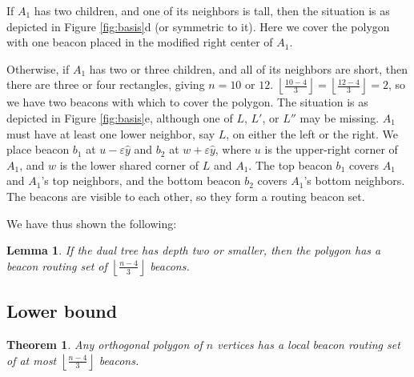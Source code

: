 \documentclass{article}
\newtheorem{thm}{Theorem}[section]
\newtheorem{lemma}{Lemma}
\newcommand{\floor}[2]{\ensuremath{\left \lfloor {\frac{#1}{#2}} \right
\rfloor}}
\begin{document}
		If $A_1$ has two children, and one of its neighbors is tall, then
		the situation is as depicted in Figure \ref{fig:basis}d (or symmetric to it).
		Here we cover the polygon with one beacon placed in the modified
		right center of $A_1$.
		
		Otherwise, if $A_1$ has two or three children, and all of its neighbors are
		short, then there are three or four rectangles, giving $n = 10$ or $12$.
		$\floor{10-4}{3} = \floor{12-4}{3} = 2$, so we have two beacons with which to
		cover the polygon.
		The situation is as depicted in Figure \ref{fig:basis}e, although one of
		$L$, $L'$, or $L''$ may be missing.
		$A_1$ must have at least one lower neighbor, say $L$,
		on either the left or the right.
		We place beacon $b_1$ at $u - \varepsilon\hat{y}$ and 
		$b_2$ at $w + \varepsilon\hat{y}$,
		where $u$ is the upper-right corner of $A_1$, and 
		$w$ is the lower shared corner of $L$ and $A_1$.
		The top beacon $b_1$ covers $A_1$ and $A_1$'s top neighbors, and the bottom
		beacon $b_2$ covers $A_1$'s bottom neighbors.  The beacons are visible to each
		other, so they form a routing beacon set.
		
		We have thus shown the following:
		
		\begin{lemma}\label{lem:basis}
		If the dual tree has depth two or smaller, then the polygon has a beacon
		routing set of $\floor{n-4}{3}$ beacons.
		\end{lemma}
		
	\subsection{Lower bound}
	
		\begin{thm}
			Any orthogonal polygon of $n$ vertices has a local beacon routing set of at
			most $\floor{n-4}{3}$ beacons.
		\end{thm}
		\newcommand{\nrect}{\ensuremath{r}}
		
\end{document}

